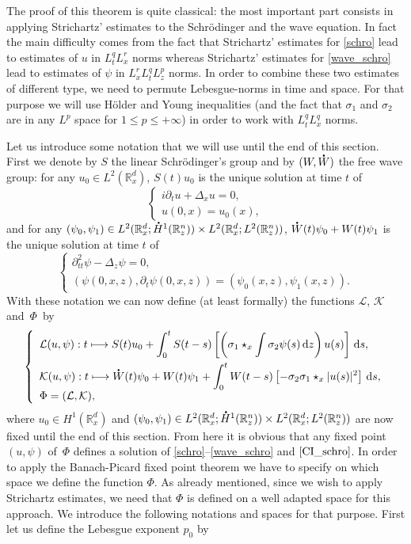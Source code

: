 \documentclass[JEP,XML,SOM,NoEqCountersInSection,NoFloatCountersInSection,Unicode,published]{cedram}
\theoremstyle{definition}
\newcommand*{\overbigdot}[1]{%
\accentset{\mbox{\large\bfseries .}}{#1}}
\newcommand{\R}{\mathbb{R}}
\let\ds\displaystyle
\newcommand{\ud}{\, {\mathrm{d}}}
\begin{document}
The proof of this theorem is quite classical: the most important part consists in applying Strichartz' estimates to the Schrödinger and the wave equation. In fact the main difficulty comes from the fact that Strichartz' estimates for \eqref{schro} lead to estimates of $u$ in $L_{t}^{q}L_{x}^{r}$ norms whereas Strichartz' estimates for \eqref{wave_schro} lead to estimates of $\psi$ in $L_{x}^{r}L_{t}^{q}L_{z}^{p}$ norms. In order to combine these two estimates
of different type,
we need to permute Lebesgue-norms in time and space. For that purpose we will use Hölder and Young inequalities (and the fact that $\sigma_{1}$ and $\sigma_{2}$ are in any $L^{p}$ space for $1\leq p\leq+\infty$) in order to work with $L_{t}^{q}L_{x}^{q}$ norms.

Let us introduce some notation that we will use until the end of this section. First we denote by $S$ the linear Schrödinger's group and by $(W,\overbigdot{W})$ the free wave group: for any $u_{0}\in L^{2}(\R_{x}^{d})$, $S(t)u_{0}$ is the unique solution at time $t$ of
\[
\left\{\begin{array}{l}
\ds i\partial_{t}u+\Delta_{x}u=0,\\
\ds u(0,x)=u_{0}(x),
\end{array}\right.
\]
and for any $(\psi_{0},\psi_{1})\in L^{2}(\R_{x}^{d};\overbigdot{H}^{1}(\R_{z}^{n}))\times L^{2}(\R_{x}^{d};L^{2}(\R_{z}^{n}))$, $\overbigdot{W}(t)\psi_{0}+W(t)\psi_{1}$ is the unique solution at time $t$ of
\[
\left\{\begin{array}{l}
\ds \partial_{tt}^{2}\psi-\Delta_{z}\psi=0,\\[3pt]
\ds (\psi(0,x,z),\partial_{t}\psi(0,x,z))=(\psi_{0}(x,z),\psi_{1}(x,z)).
\end{array}\right.
\]
With these notation we can now define (at least formally) the functions $\mathcal{L}$, $\mathcal{K}$ and~$\Phi$~by
\[
\left\{\begin{array}{l}
\ds \mathcal{L}(u,\psi):t\longmapsto S(t)u_{0}+\int_{0}^{t}S(t-s)\left[\left(\sigma_{1}\star_{x}\int\sigma_{2}\psi(s)\ud z\right)u(s)\right]\ud s,\\[10pt]
\ds\mathcal{K}(u,\psi):t\longmapsto \overbigdot{W}(t)\psi_{0}+W(t)\psi_{1}+\int_{0}^{t}W(t-s)\left[-\sigma_{2}\sigma_{1}\star_{x}|u(s)|^{2}\right]\ud s,\\
\Phi=(\mathcal{L},\mathcal{K}),
\end{array}\right.
\]
where $u_{0}\in H^{1}(\R_{x}^{d})$ and $(\psi_{0},\psi_{1})\in L^{2}(\R_{x}^{d};\overbigdot{H}^{1}(\R_{z}^{n}))\times L^{2}(\R_{x}^{d};L^{2}(\R_{z}^{n}))$ are now fixed until the end of this section. From here it is obvious that any fixed point $(u,\psi)$ of~$\Phi$ defines a solution of \eqref{schro}--\eqref{wave_schro} and $\eqref{CI_schro}$. In order to apply the Banach-Picard fixed point theorem we have to specify on which space we define the function $\Phi$. As already mentioned, since we wish to apply Strichartz estimates, we need that $\Phi$ is defined on a well adapted space for this approach. We introduce the following notations and spaces for that purpose. First let us define the Lebesgue exponent $p_{0}$ by
\end{document}
